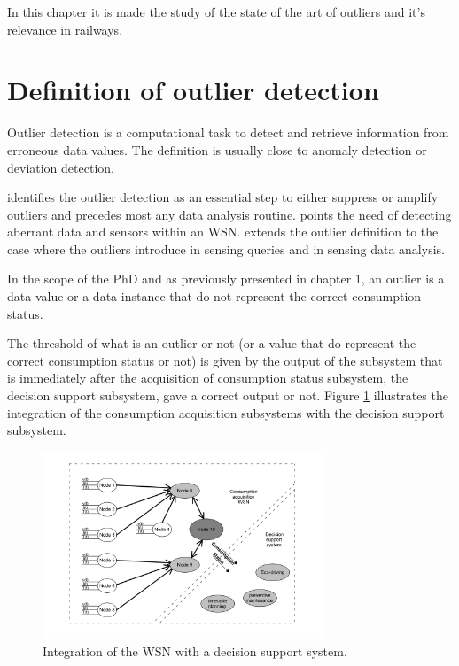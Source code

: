 In this chapter it is  made the study of the state of the art of outliers and it's relevance in railways.
\lipsum[4-4]

\section{Definition of outlier detection}

Outlier detection is a computational task to detect and retrieve information from erroneous data values. The definition is usually close to anomaly detection or deviation detection. 

\cite{class:branch:2006} identifies the outlier detection as an essential step to either suppress or amplify outliers and precedes most any data analysis routine. \cite{nn:abid:2016} points the need of detecting aberrant data and sensors within an WSN. \cite{nn:zhuang:2006} extends the outlier definition to the case where the outliers introduce in sensing queries and in sensing data analysis.

\vspace{1em}

In the scope of the PhD and as previously presented in chapter 1, an outlier is a data value or a data instance that do not represent the correct consumption status.

The threshold of what is an outlier or not (or a value that do represent the correct consumption status or not) is given by the output of the subsystem that is immediately after the acquisition of consumption status subsystem, the decision support subsystem, gave a correct output or not. Figure \ref{fig:general} illustrates the integration of the consumption acquisition subsystems with the decision support subsystem.


\begin{figure}[h!]
	\centering
	\includegraphics[width=0.75\textwidth,keepaspectratio]{figures/general}
	\caption{Integration of the WSN with a decision support system. }
	\label{fig:general}
\end{figure}

